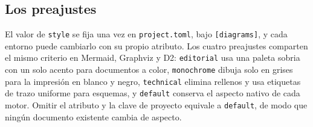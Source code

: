 \subsection{Los preajustes}

El valor de \texttt{style} se fija una vez en \texttt{project.toml}, bajo
\texttt{[diagrams]}, y cada entorno puede cambiarlo con su propio atributo.
Los cuatro preajustes comparten el mismo criterio en Mermaid, Graphviz y D2:
\texttt{editorial} usa una paleta sobria con un solo acento para documentos a
color, \texttt{monochrome} dibuja solo en grises para la impresión en blanco y
negro, \texttt{technical} elimina rellenos y usa etiquetas de trazo uniforme
para esquemas, y \texttt{default} conserva el aspecto nativo de cada motor.
Omitir el atributo y la clave de proyecto equivale a \texttt{default}, de
modo que ningún documento existente cambia de aspecto.
